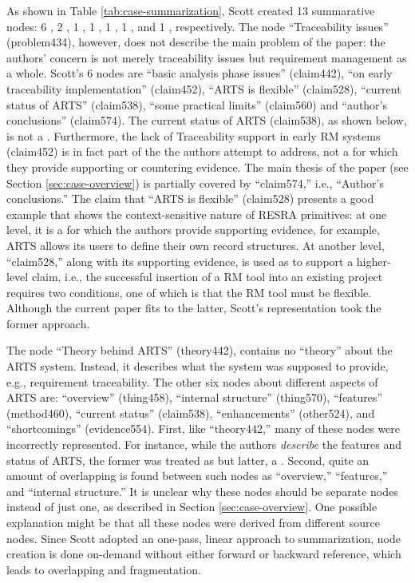 As shown in Table \ref{tab:case-summarization}, Scott created 13
summarative nodes: 6 , 2 , 1 , 1 , 1 , 1 , and 1 , respectively. The node ``Traceability
issues'' (problem434), however, does not describe the main problem of the
paper: the authors' concern is not merely traceability issues but
requirement management as a whole. Scott's 6  nodes are
``basic analysis phase issues'' (claim442), ``on early traceability
implementation'' (claim452), ``ARTS is flexible'' (claim528), ``current
status of ARTS'' (claim538), ``some practical limits'' (claim560) and
``author's conclusions'' (claim574). The current status of ARTS (claim538),
as shown below, is not a . Furthermore, the lack of
Traceability support in early RM systems (claim452) is in fact part of the
 the authors attempt to address, not a  for which they provide supporting or countering evidence. The main
thesis of the paper (see Section \ref{sec:case-overview}) is partially
covered by ``claim574,'' i.e., ``Author's conclusions.'' The claim that
``ARTS is flexible'' (claim528) presents a good example that shows the
context-sensitive nature of RESRA primitives: at one level, it is a
 for which the authors provide supporting evidence, for
example, ARTS allows its users to define their own record structures. At
another level, ``claim528,'' along with its supporting evidence, is used as
 to support a higher-level claim, i.e., the successful
insertion of a RM tool into an existing project requires two conditions,
one of which is that the RM tool must be flexible.  Although the current
paper fits to the latter, Scott's representation took the former approach.

The node ``Theory behind ARTS'' (theory442), contains no ``theory'' about
the ARTS system. Instead, it describes what the system was supposed to
provide, e.g., requirement traceability. The other six nodes about
different aspects of ARTS are: ``overview'' (thing458), ``internal
structure'' (thing570), ``features'' (method460), ``current status''
(claim538), ``enhancements'' (other524), and ``shortcomings''
(evidence554). First, like ``theory442,'' many of these nodes were
incorrectly represented. For instance, while the authors {\it describe\/}
the features and status of ARTS, the former was treated as  but latter, a . Second, quite an amount of
overlapping is found between such nodes as ``overview,'' ``features,'' and
``internal structure.'' It is unclear why these nodes should be separate
nodes instead of just one, as described in Section \ref{sec:case-overview}.
One possible explanation might be that all these nodes were derived from
different source nodes.  Since Scott adopted an one-pass, linear approach
to summarization, node creation is done on-demand without either forward or
backward reference, which leads to overlapping and fragmentation.

